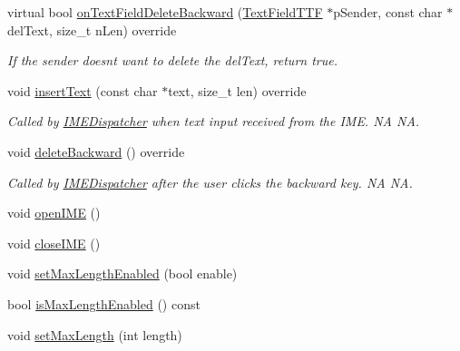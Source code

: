 \begin{DoxyCompactItemize}
\mbox{\label{classui_1_1UICCTextField_ae28c22122ad47238aaf48001a0413aea}} 
virtual bool \hyperlink{classui_1_1UICCTextField_ae28c22122ad47238aaf48001a0413aea}{on\+Text\+Field\+Delete\+Backward} (\hyperlink{classTextFieldTTF}{Text\+Field\+T\+TF} $\ast$p\+Sender, const char $\ast$del\+Text, size\+\_\+t n\+Len) override
\begin{DoxyCompactList}\small\item\em If the sender doesn\textquotesingle{}t want to delete the del\+Text, return true. \end{DoxyCompactList}\item 
\mbox{\label{classui_1_1UICCTextField_ac55d7a518d395742fe01ff21f000feb5}} 
void \hyperlink{classui_1_1UICCTextField_ac55d7a518d395742fe01ff21f000feb5}{insert\+Text} (const char $\ast$text, size\+\_\+t len) override
\begin{DoxyCompactList}\small\item\em Called by \hyperlink{classIMEDispatcher}{I\+M\+E\+Dispatcher} when text input received from the I\+ME.  NA  NA. \end{DoxyCompactList}\item 
\mbox{\label{classui_1_1UICCTextField_ac7b7cc8ebdb6ffa1f9c480a8e9173a4c}} 
void \hyperlink{classui_1_1UICCTextField_ac7b7cc8ebdb6ffa1f9c480a8e9173a4c}{delete\+Backward} () override
\begin{DoxyCompactList}\small\item\em Called by \hyperlink{classIMEDispatcher}{I\+M\+E\+Dispatcher} after the user clicks the backward key.  NA  NA. \end{DoxyCompactList}\item 
void \hyperlink{classui_1_1UICCTextField_a4f7601ce915caa7512271cd991661301}{open\+I\+ME} ()
\item 
void \hyperlink{classui_1_1UICCTextField_a5091bd4b413b62335232752f4d6e6c89}{close\+I\+ME} ()
\item 
void \hyperlink{classui_1_1UICCTextField_a195a8a8163331112e9ce7e7e60d02d81}{set\+Max\+Length\+Enabled} (bool enable)
\item 
bool \hyperlink{classui_1_1UICCTextField_a80855457b243d58c55f19f9ca3933758}{is\+Max\+Length\+Enabled} () const
\item 
void \hyperlink{classui_1_1UICCTextField_a34d3813016eefd391606ed1aa0b7f0b5}{set\+Max\+Length} (int length)

\end{DoxyCompactItemize}
